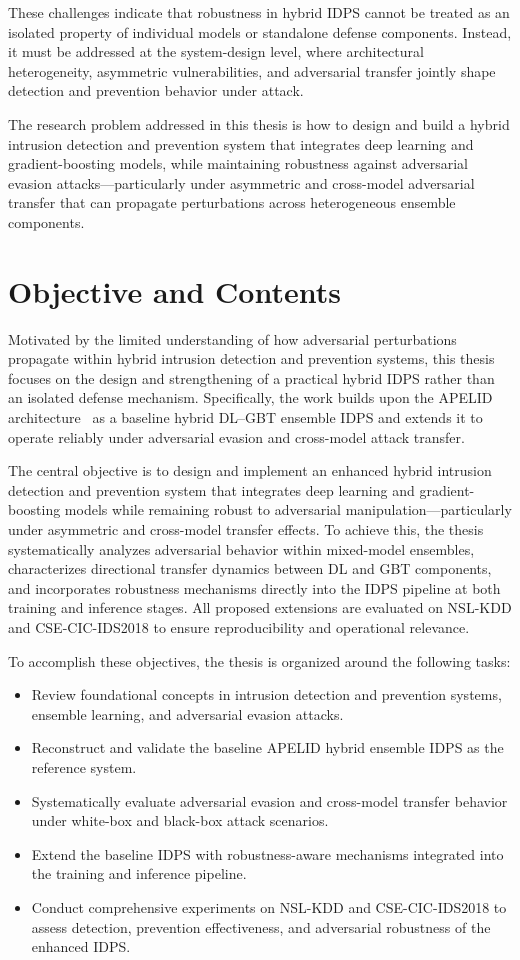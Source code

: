 \documentclass[12pt, a4paper, reqno, oneside]{book}
\newcommand \sect[1]{%
  \section*{#1}%
  \addcontentsline{toc}{section}{#1}}
\begin{document}
These challenges indicate that robustness in hybrid IDPS cannot be treated as an isolated property of individual models or standalone defense components. Instead, it must be addressed at the system-design level, where architectural heterogeneity, asymmetric vulnerabilities, and adversarial transfer jointly shape detection and prevention behavior under attack.

The research problem addressed in this thesis is how to design and build a hybrid intrusion detection and prevention system that integrates deep learning and gradient-boosting models, while maintaining robustness against adversarial evasion attacks---particularly under asymmetric and cross-model adversarial transfer that can propagate perturbations across heterogeneous ensemble components.




\sect{Objective and Contents}
\label{sect:objective}

Motivated by the limited understanding of how adversarial perturbations propagate within hybrid intrusion detection and prevention systems, this thesis focuses on the design and strengthening of a practical hybrid IDPS rather than an isolated defense mechanism. Specifically, the work builds upon the APELID architecture~\cite{jAPELID24} as a baseline hybrid DL--GBT ensemble IDPS and extends it to operate reliably under adversarial evasion and cross-model attack transfer.

The central objective is to design and implement an enhanced hybrid intrusion detection and prevention system that integrates deep learning and gradient-boosting models while remaining robust to adversarial manipulation---particularly under asymmetric and cross-model transfer effects. To achieve this, the thesis systematically analyzes adversarial behavior within mixed-model ensembles, characterizes directional transfer dynamics between DL and GBT components, and incorporates robustness mechanisms directly into the IDPS pipeline at both training and inference stages. All proposed extensions are evaluated on NSL-KDD and CSE-CIC-IDS2018 to ensure reproducibility and operational relevance.

To accomplish these objectives, the thesis is organized around the following tasks:

\begin{itemize}
    \item Review foundational concepts in intrusion detection and prevention systems, ensemble learning, and adversarial evasion attacks.
    \item Reconstruct and validate the baseline APELID hybrid ensemble IDPS as the reference system.
    \item Systematically evaluate adversarial evasion and cross-model transfer behavior under white-box and black-box attack scenarios.
    \item Extend the baseline IDPS with robustness-aware mechanisms integrated into the training and inference pipeline.
    \item Conduct comprehensive experiments on NSL-KDD and CSE-CIC-IDS2018 to assess detection, prevention effectiveness, and adversarial robustness of the enhanced IDPS.
\end{itemize}
\end{document}
